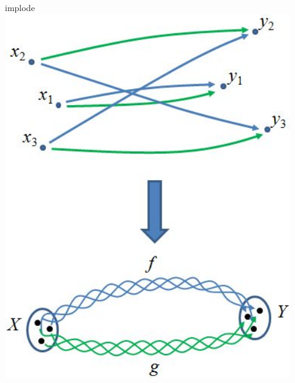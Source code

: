 \begin{frame}
\begin{columns}[t]
\begin{column}{0.5\textwidth}
\begin{block}{implode}
\centering\noindent\includegraphics[width=0.92\textwidth]{fig/implode.jpg}
\end{block}
\end{column}
\end{columns}
\end{frame}